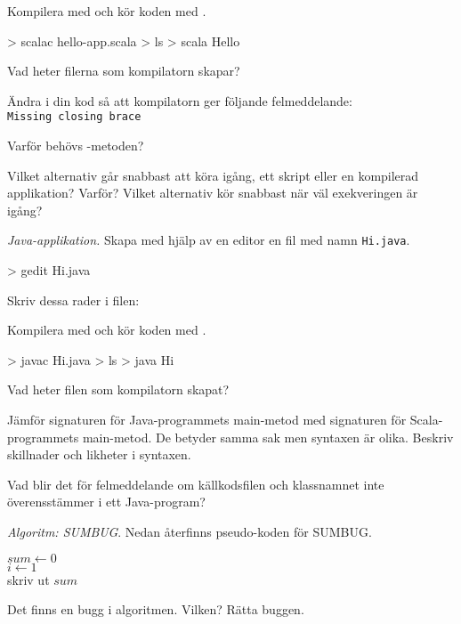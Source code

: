 \Subtask Kompilera med  och kör koden med .
\begin{REPL}
> scalac hello-app.scala
> ls
> scala Hello
\end{REPL}
Vad heter filerna som kompilatorn skapar?

\Subtask Ändra i din kod så att kompilatorn ger följande felmeddelande: \\
\texttt{Missing closing brace}

\Subtask\Pen Varför behövs -metoden?

\Subtask\Pen Vilket alternativ går snabbast att köra igång, ett skript eller en kompilerad applikation? Varför? Vilket alternativ kör snabbast när väl exekveringen är igång?


\Task \label{task:java} \emph{Java-applikation.} Skapa med hjälp av en editor en fil med namn \texttt{Hi.java}.
\begin{REPL}
> gedit Hi.java
\end{REPL}
Skriv dessa rader i filen:


\noindent Kompilera med  och kör koden med .
\begin{REPL}
> javac Hi.java
> ls
> java Hi
\end{REPL}

\Subtask\Pen Vad heter filen som kompilatorn skapat?

\Subtask\Pen Jämför signaturen för Java-programmets main-metod med signaturen för Scala-programmets main-metod. De betyder samma sak men syntaxen är olika. Beskriv skillnader och likheter i syntaxen.

\Subtask\Pen Vad blir det för felmeddelande om källkodsfilen och klassnamnet inte överensstämmer i ett Java-program?


\Task \emph{Algoritm: SUMBUG}. Nedan återfinns pseudo-koden för SUMBUG. 

\begin{algorithm}[H]
 
 $sum \leftarrow 0$ \\
 $i \leftarrow 1$  \\
 skriv ut $sum$
\end{algorithm}

\Subtask\Pen Det finns en bugg i algoritmen. Vilken? Rätta buggen.

